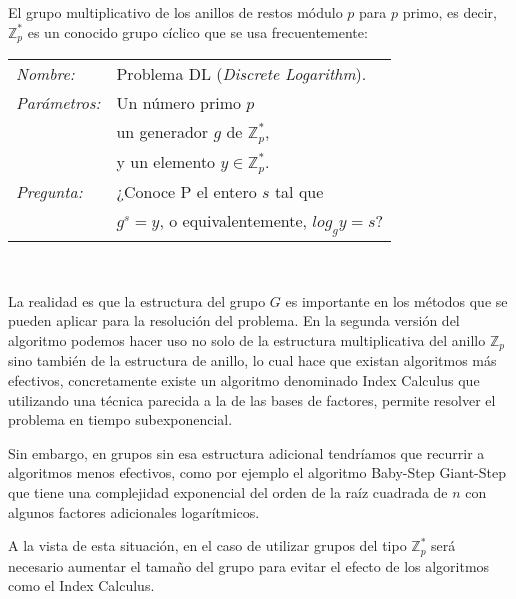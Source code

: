 \hfil

El grupo multiplicativo de los anillos de restos m\'odulo $p$ para $p$ primo, es decir, ${\mathbb Z}^*_p$ es un conocido grupo c\'iclico que se usa frecuentemente:

\hfil

\begin{tabular}{|ll}
	\textit{Nombre:} & Problema DL (\textit{Discrete Logarithm}). \\
	\textit{Parámetros:} & Un n\'umero primo $p$ \\ & un generador $g$ de ${\mathbb Z}_p^*$,\\ & y un elemento $y\in {\mathbb Z}_p^*$. \\
	\textit{Pregunta:} & ¿Conoce P el entero $s$ tal que \\ & $g^s = y$, o equivalentemente, $log_g y = s$? \\
\end{tabular}
\\

\hfil

La realidad es que la estructura del grupo $G$ es importante en los m\'etodos que se pueden aplicar para la resoluci\'on del problema. En la segunda versi\'on del algoritmo
podemos hacer uso no solo de la estructura multiplicativa del anillo ${\mathbb Z}_p$ sino tambi\'en de la estructura de anillo, lo cual hace que existan algoritmos m\'as efectivos,
concretamente existe un algoritmo denominado Index Calculus que utilizando una t\'ecnica parecida a la de las bases de factores, permite resolver el problema en tiempo subexponencial.

Sin embargo, en grupos sin esa estructura adicional tendr\'iamos que recurrir a algoritmos menos efectivos, como por ejemplo el algoritmo Baby-Step Giant-Step que tiene una complejidad
exponencial del orden de la ra\'iz cuadrada de $n$ con algunos factores adicionales logar\'itmicos.

A la vista de esta situaci\'on, en el caso de utilizar grupos del tipo ${\mathbb Z}_p^*$ ser\'a necesario aumentar el tama\~no del grupo para evitar el efecto de los algoritmos
como el Index Calculus.

